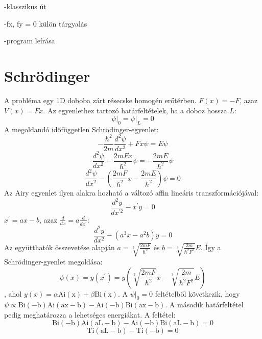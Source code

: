 \documentclass[a4paper,titlepage]{article}
\newcommand{\Ai}[1]{\mathrm{Ai\left(#1\right)}}
\newcommand{\Bi}[1]{\mathrm{Bi\left(#1\right)}}
\newcommand{\Ti}[1]{\mathrm{Ti\left(#1\right)}}
\begin{document}
	-klasszikus út
	
	-fx, fy = 0 külön tárgyalás
	
	-program leírása
\section{Schrödinger}
	A probléma egy 1D doboba zárt résecske homogén erőtérben. $F(x)=-F$, azaz $V(x) = Fx$.
	Az egyenlethez tartozó határfeltételek, ha a doboz hossza $L$:
	\begin{equation}
		\psi \big\rvert_0 = \psi \big \rvert_L = 0
	\end{equation}
	A megoldandó időfüggetlen Schrödinger-egyenlet:
	\begin{equation}
		-\frac{\hbar^2}{2m}\frac{d^2\psi}{dx^2} + Fx\psi = E\psi
	\end{equation}
	\begin{equation}
		\frac{d^2\psi}{dx^2} - \frac{2mFx}{\hbar^2}\psi = -\frac{2mE}{\hbar^2}\psi
	\end{equation}
	\begin{equation}
		\frac{d^2\psi}{dx^2} - \left(\frac{2mF}{\hbar^2}x - \frac{2mE}{\hbar^2}\right)\psi = 0
	\end{equation}
	Az Airy egyenlet ilyen alakra hozható a változó affin lineáris transzformációjával:
	\begin{equation}
		\frac{d^2y}{dx^{\prime 2}} - x^\prime y = 0
	\end{equation}
	$x^\prime = ax - b$, azaz $\frac{d}{dx} = a\frac{d}{dx^\prime}$:
	\begin{equation}
		\frac{d^2y}{dx^2} - \left(a^3x - a^2b\right)y = 0
	\end{equation}
	Az együtthatók összevetése alapján $a = \sqrt[3]{\frac{2mF}{\hbar^2}}$ és $b = \sqrt[3]{\frac{2m}{\hbar^2F^2}}E$. Így a Schrödinger-gyenlet megoldása:
	\begin{equation}
		\psi(x) = y(x^\prime) = y\left(\sqrt[3]{\frac{2mF}{\hbar^2}}x - \sqrt[3]{\frac{2m}{\hbar^2F^2}}E\right)
	\end{equation}
	, ahol $y(x) = \alpha \Ai{x} + \beta \Bi{x}$.
	A $\psi \big\rvert_0 = 0$ feltételből következik, hogy $\psi \propto \Bi{-b}\Ai{ax-b} - \Ai{-b}\Bi{ax-b}$. A második határfeltétel pedig meghatározza a lehetséges energiákat. A feltétel:
	\begin{equation}
		\Bi{-b}\Ai{aL-b} - \Ai{-b}\Bi{aL-b} = 0
	\end{equation}
	\begin{equation}
		\label{box_energiaszintek_egyenlet}
		\Ti{aL-b} - \Ti{-b} = 0
	\end{equation}
\end{document}
